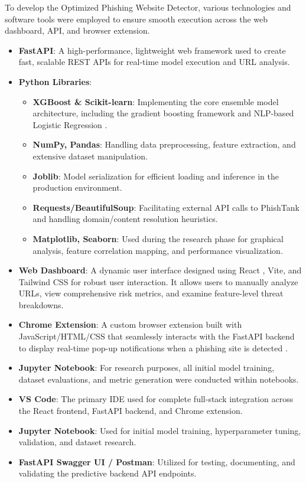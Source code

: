 \noindent
To develop the Optimized Phishing Website Detector, various technologies and software tools were employed to ensure smooth execution across the web dashboard, API, and browser extension.
\noindent
{}
\begin{itemize}
\item \textbf{FastAPI}: A high-performance, lightweight web framework \cite{ref10} used to create fast, scalable REST APIs for real-time model execution and URL analysis.
\item \textbf{Python Libraries}:
\begin{itemize}
\item \textbf{XGBoost \& Scikit-learn}: Implementing the core ensemble model architecture, including the gradient boosting framework and NLP-based Logistic Regression \cite{ref12, ref11, ref13}.
\item \textbf{NumPy, Pandas}: Handling data preprocessing, feature extraction, and extensive dataset manipulation.
\item \textbf{Joblib}: Model serialization for efficient loading and inference in the production environment.
\item \textbf{Requests/BeautifulSoup}: Facilitating external API calls to PhishTank and handling domain/content resolution heuristics.
\item \textbf{Matplotlib, Seaborn}: Used during the research phase for graphical analysis, feature correlation mapping, and performance visualization.
\end{itemize}
\end{itemize}
\noindent
{}
\begin{itemize}
\item \textbf{Web Dashboard}: A dynamic user interface designed using React \cite{ref9}, Vite, and Tailwind CSS \cite{ref22} for robust user interaction. It allows users to manually analyze URLs, view comprehensive risk metrics, and examine feature-level threat breakdowns.
\item \textbf{Chrome Extension}: A custom browser extension built with JavaScript/HTML/CSS that seamlessly interacts with the FastAPI backend to display real-time pop-up notifications when a phishing site is detected \cite{ref15}.
\item \textbf{Jupyter Notebook}: For research purposes, all initial model training, dataset evaluations, and metric generation were conducted within notebooks.
\end{itemize}
\noindent
{}
\begin{itemize}
\item \textbf{VS Code}: The primary IDE used for complete full-stack integration across the React frontend, FastAPI backend, and Chrome extension.
\item \textbf{Jupyter Notebook}: Used for initial model training, hyperparameter tuning, validation, and dataset research.
\item \textbf{FastAPI Swagger UI / Postman}: Utilized for testing, documenting, and validating the predictive backend API endpoints.
\end{itemize}

